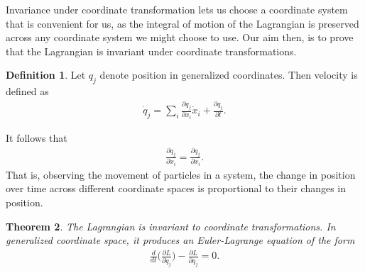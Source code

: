 \documentclass[10pt, psamsfonts]{amsart}
\newtheorem{thm}{Theorem}[section]
\theoremstyle{definition}
\newtheorem{defn}[thm]{Definition}
\theoremstyle{remark}
\numberwithin{equation}{section}
\begin{document}
Invariance under coordinate transformation lets us choose a coordinate system that is convenient for us, as the integral of motion of the Lagrangian is preserved across any coordinate system we might choose to use. Our aim then, is to prove that the Lagrangian is invariant under coordinate transformations.

\begin{defn}
Let $q_j$ denote position in generalized coordinates. Then velocity is defined as
\begin{align}
  \label{eq:Formal Velocity}
  \dot{q}_j = \sum_i \frac{\partial q_j}{\partial x_i} \dot{x}_i + \frac{\partial q_j}{\partial t}. 
\end{align}
\end{defn}
\noindent It follows that
\begin{align}
  \label{eq:Proportionality}
  \frac{\partial \dot{q}_j}{\partial \dot{x}_i} = \frac{\partial q_j}{\partial x_i}.
\end{align}
That is, observing the movement of particles in a system, the change in position over time across different coordinate spaces is proportional to their changes in position.

\begin{thm}
  The Lagrangian is invariant to coordinate transformations. In generalized coordinate space, it produces an Euler-Lagrange equation of the form
  \begin{align*}
    \frac{d}{dt} \bigg( \frac{\partial L}{\partial \dot{q}_j}  \bigg) - \frac{\partial L }{\partial q_j} = 0.
  \end{align*}
\end{thm}
\end{document}
